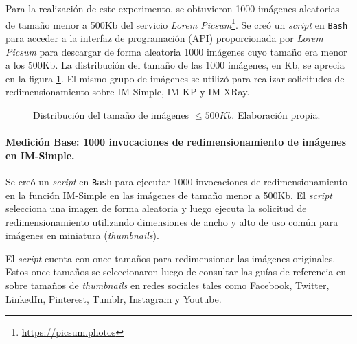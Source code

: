 Para la realización de este experimento, se obtuvieron 1000 imágenes aleatorias de tamaño menor a 500Kb del servicio \emph{Lorem Picsum}\footnote{\url{https://picsum.photos}}. Se creó un \emph{script} en \texttt{Bash} para acceder a la interfaz de programación (API) proporcionada por \emph{Lorem Picsum} para descargar de forma aleatoria 1000 imágenes cuyo tamaño era menor a los 500Kb. La distribución del tamaño de las 1000 imágenes, en Kb, se aprecia en la figura \ref{fig:distribucion-tamanno-imagenes-hasta-500kb}. El mismo grupo de imágenes se utilizó para realizar solicitudes de redimensionamiento sobre IM-Simple, IM-KP y IM-XRay.

\begin{figure}
\hspace{-1cm}
\caption[Distribución del tamaño de imágenes $\leq 500Kb$]{Distribución del tamaño de imágenes $\leq 500Kb$. Elaboración propia.}
\label{fig:distribucion-tamanno-imagenes-hasta-500kb}
\end{figure}

\paragraph{Medición Base: 1000 invocaciones de redimensionamiento de imágenes en IM-Simple.} 
Se creó un \emph{script} en \texttt{Bash} para ejecutar 1000 invocaciones de redimensionamiento en la función IM-Simple en las imágenes de tamaño menor a 500Kb. El \emph{script} selecciona una imagen de forma aleatoria y luego ejecuta la solicitud de redimensionamiento utilizando dimensiones de ancho y alto de uso común para imágenes en miniatura (\emph{thumbnails}).

El \emph{script} cuenta con once tamaños para redimensionar las imágenes originales. Estos once tamaños se seleccionaron luego de consultar las guías de referencia en \cite{thumbnail-ref-1, thumbnail-ref-2} sobre tamaños de \emph{thumbnails} en redes sociales tales como Facebook, Twitter, LinkedIn, Pinterest, Tumblr, Instagram y Youtube.

